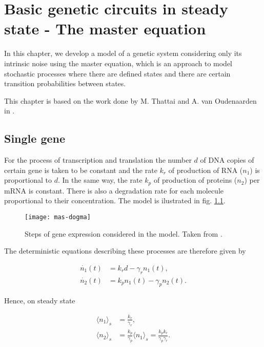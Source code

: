 \chapter{Basic genetic circuits in steady state - The master equation}
\label{ch:master}

In this chapter, we develop a model of a genetic system considering only its intrinsic noise using the master equation, which is an approach to model stochastic processes where there are defined states and there are certain transition probabilities between states.

This chapter is based on the work done by M. Thattai and A. van Oudenaarden in \cite{thattai01}.

\section{Single gene}
\label{sec:mas-single_gene}
For the process of transcription and translation the number $d$ of DNA copies of certain gene is taken to be constant and the rate $k_r$ of production of RNA ($n_1$) is proportional to $d$. In the same way, the rate $k_p$ of production of proteins ($n_2$) per mRNA is constant. There is also a degradation rate for each molecule proportional to their concentration. The model is ilustrated in fig. \ref{fig:mas-dogma}.

\begin{figure}[H]
  \centering
  \texttt{[image: mas-dogma]}
  \caption[Model of gene expression for a single gene]{\label{fig:mas-dogma} Steps of gene expression considered in the model. Taken from \cite{thattai01}.}
\end{figure}

The deterministic equations describing these processes are therefore given by

\begin{align}
  \dot{n_1}(t) &= k_rd-\gamma_rn_1(t)\label{eq:mas-simple_det_1},\\
  \dot{n_2}(t) &= k_pn_1(t)-\gamma_pn_2(t) \label{eq:mas-simple_det_2}.
\end{align}

Hence, on steady state

\begin{align}
  \langle n_1 \rangle_s &= \frac{k_r}{\gamma_r} \label{eq:mas-simple_ss_1}, \\
  \langle n_2 \rangle_s &= \frac{k_p}{\gamma_p} \langle n_1 \rangle_s = \frac{k_pk_r}{\gamma_p\gamma_r} \label{eq:mas-simple_ss_2}.
\end{align}

